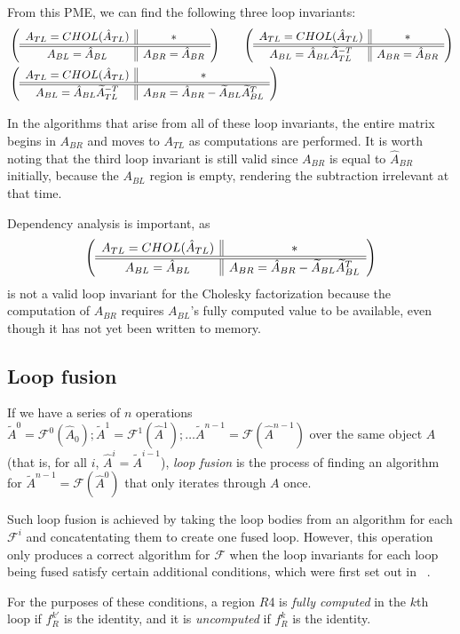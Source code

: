 \documentclass[12pt,letterpaper]{article}
\newcommand*{\mycite}[1]{~\cite{#1}}
\newcommand*{\opF}{\mathcal{F}}
\newcommand*{\opf}{f}
\begin{document}
From this PME, we can find the following three loop invariants:
\begin{align*}
  &\left( \begin{array}{c || c} A_{TL} = CHOL(\hat{A}_{TL}) & * \\ \hline \hline A_{BL} = \hat{A}_{BL} & A_{BR} = \hat{A}_{BR} \end{array} \right) \qquad
  \left( \begin{array}{c || c} A_{TL} = CHOL(\hat{A}_{TL}) & * \\ \hline \hline A_{BL} = \hat{A}_{BL}\widetilde{A}_{TL}^{-T} & A_{BR} = \hat{A}_{BR} \end{array} \right)\\
  &\left( \begin{array}{c || c} A_{TL} = CHOL(\hat{A}_{TL}) & * \\ \hline \hline A_{BL} = \hat{A}_{BL}\widetilde{A}_{TL}^{-T} & A_{BR} = \hat{A}_{BR} - \widetilde{A}_{BL}\widetilde{A}_{BL}^T \end{array} \right)
\end{align*}

In the algorithms that arise from all of these loop invariants, the entire matrix begins in $A_{BR}$ and moves to $A_{TL}$ as computations are performed.
It is worth noting that the third loop invariant is still valid since $A_{BR}$ is equal to $\hat{A}_{BR}$ initially, because the $A_{BL}$ region is empty, rendering the subtraction irrelevant at that time.

Dependency analysis is important, as
\begin{equation*}
  \left( \begin{array}{c || c} A_{TL} = CHOL(\hat{A}_{TL}) & * \\ \hline \hline A_{BL} = \hat{A}_{BL} & A_{BR} = \hat{A}_{BR} - \widetilde{A}_{BL}\widetilde{A}_{BL}^T \end{array} \right)
\end{equation*}
is not a valid loop invariant for the Cholesky factorization because the computation of $A_{BR}$ requires $A_{BL}$'s fully computed value to be available, even though it has not yet been written to memory.

\subsection{Loop fusion}
If we have a series of $n$ operations $\widetilde{A}^0 = \opF^0(\hat{A}_0); \widetilde{A}^1 = \opF^1(\hat{A}^1); \ldots \widetilde{A}^{n - 1} = \opF(\hat{A}^{n - 1})$
over the same object $A$ (that is, for all $i$, $\hat{A}^i = \widetilde{A}^{i - 1}$), \emph{loop fusion} is the process of finding an algorithm for $\widetilde{A}^{n - 1} = \opF(\hat{A}^0)$ that only iterates through $A$ once.

Such loop fusion is achieved by taking the loop bodies from an algorithm for each $\opF^i$ and concatentating them to create one fused loop.
However, this operation only produces a correct algorithm for $\opF$ when the loop invariants for each loop being fused satisfy certain additional conditions, which were first set out in \mycite{Low2013}.

For the purposes of these conditions, a region $R$4 is \emph{fully computed} in the $k$th loop if $\opf_R^{k'}$ is the identity, and it is \emph{uncomputed} if $\opf_R^k$ is the identity.
\end{document}
